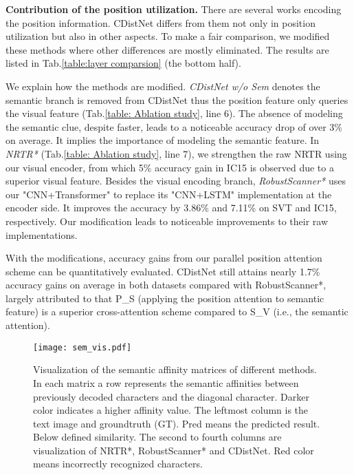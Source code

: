\noindent\textbf{Contribution of the position utilization.}
There are several works encoding the position information. CDistNet differs from them not only in position utilization but also in other aspects. To make a fair comparison, we modified these methods where other differences are mostly eliminated. The results are listed in Tab.\ref{table:layer comparsion} (the bottom half).

We explain how the methods are modified. \emph{CDistNet w/o Sem} denotes the semantic branch is removed from CDistNet thus the position feature only queries the visual feature (Tab.\ref{table: Ablation study}, line 6). The absence of modeling the semantic clue, despite faster, leads to a noticeable accuracy drop of over 3\% on average. It implies the importance of modeling the semantic feature. In \emph{NRTR*} (Tab.\ref{table: Ablation study}, line 7), we strengthen the raw NRTR \citep{sheng2019nrtr} using our visual encoder, from which 5\% accuracy gain in IC15 is observed due to a superior visual feature. Besides the visual encoding branch, \emph{RobustScanner*} uses our "CNN+Transformer" to replace its "CNN+LSTM" implementation at the encoder side. It improves the accuracy by 3.86\% and 7.11\% on SVT and IC15, respectively. Our modification leads to noticeable improvements to their raw implementations.

With the modifications, accuracy gains from our parallel position attention scheme can be quantitatively evaluated. CDistNet still attains nearly 1.7\% accuracy gains on average in both datasets compared with RobustScanner*, largely attributed to that P\_S (applying the position attention to semantic feature) is a superior cross-attention scheme compared to S\_V (i.e., the semantic attention).



\begin{figure*}[ht]
\centering
\texttt{[image: sem\_vis.pdf]} \caption{Visualization of the semantic affinity matrices of different methods. In each matrix a row represents the semantic affinities between previously decoded characters and the diagonal character. Darker color indicates a higher affinity value. The leftmost column is the text image and groundtruth (GT). Pred means the predicted result. Below defined similarity. The second to fourth columns are visualization of NRTR*, RobustScanner* and CDistNet. Red color means incorrectly recognized characters.}
\label{fig10:sem_pos_attention}
\end{figure*}

